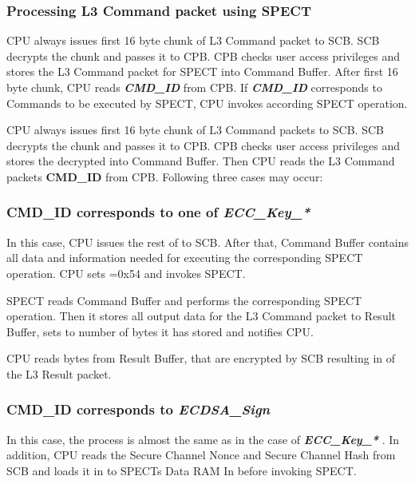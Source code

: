 \documentclass[notconfidential]{tropic_design_spec}
\def\LLLCMD{L3 Command packet}
\def\LLLRES{L3 Result packet}
\newcommand{\TsApiCmd}[1]{%
\mbox{\textit{\textbf{#1}}}%
}
\newcommand{\TsApiCmdFld}[1]{%
\mbox{\textbf{#1}}%
}
\begin{document}
\newpage
\subsubsection*{Processing \LLLCMD{} using SPECT}

CPU always issues first 16 byte chunk of \LLLCMD{} to SCB. SCB decrypts the chunk and passes
it to CPB. CPB checks user access privileges and stores the  \LLLCMD{} for SPECT into Command
Buffer. After first 16 byte chunk, CPU reads \TsApiCmd{CMD_ID} from CPB.
If \TsApiCmd{CMD_ID} corresponds to Commands to be executed by SPECT, CPU
invokes according SPECT operation.

CPU always issues first 16 byte chunk of \LLLCMD{}s  to SCB. SCB decrypts the chunk and passes
it to CPB. CPB checks user access privileges and stores the decrypted  into
Command Buffer. Then CPU reads the \LLLCMD{}s \TsApiCmdFld{CMD_ID} from CPB. Following three cases may occur:

\subsubsection*{\TsApiCmdFld{CMD_ID} corresponds to one of \TsApiCmd{ECC_Key_*}}

In this case, CPU issues the rest of  to SCB. After that, Command Buffer contains all data
and information needed for executing the corresponding \linebreak SPECT operation. CPU sets
=0x54 and invokes SPECT.

SPECT reads Command Buffer and performs the corresponding SPECT operation. Then it stores all output
data for the \LLLCMD{} to Result Buffer, sets \linebreak {} to number of bytes
it has stored and notifies CPU.

CPU reads  bytes from Result Buffer, that are encrypted by SCB resulting
in  of the \LLLRES{}.

\subsubsection*{\TsApiCmdFld{CMD_ID} corresponds to \TsApiCmd{ECDSA_Sign}}

In this case, the process is almost the same as in the case of \TsApiCmd{ECC_Key_*}. In addition, CPU reads
the Secure Channel Nonce and Secure Channel Hash from SCB and loads it in to SPECTs Data RAM In before
invoking SPECT.
\end{document}
